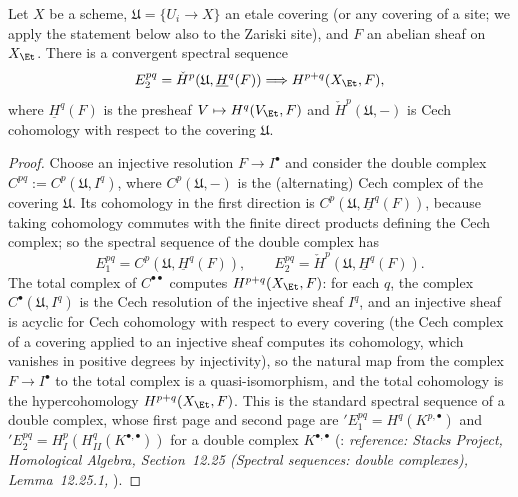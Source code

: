 \begin{lemma}
\label{lem:pcb-cech-spectral}
Let \(X\) be a scheme, \(\mathfrak U=\{U_i\to X\}\) an etale covering
(or any covering of a site; we apply the statement below also to the
Zariski site), and \(F\) an abelian sheaf on \(X_{\Et}\).  There is
a convergent spectral sequence
\[
 E_2^{pq}=\check H^p(\mathfrak U,\underline H^q(F))
 \Longrightarrow H^{p+q}(X_{\Et},F),
\]
where \(\underline H^q(F)\) is the presheaf
\(V\mapsto H^q(V_{\Et},F)\) and \(\check H^p(\mathfrak U,-)\) is
Cech cohomology with respect to the covering \(\mathfrak U\).
\end{lemma}
\begin{proof}
Choose an injective resolution \(F\to I^{\bullet}\) and consider the
double complex \(C^{pq}:=C^p(\mathfrak U,I^q)\), where
\(C^p(\mathfrak U,-)\) is the (alternating) Cech complex of the
covering \(\mathfrak U\).  Its cohomology in the first direction is
\(C^p(\mathfrak U,\underline H^q(F))\), because taking cohomology
commutes with the finite direct products defining the Cech complex;
so the spectral sequence of the double complex has
\[
 E_1^{pq}=C^p(\mathfrak U,\underline H^q(F)),\qquad
 E_2^{pq}=\check H^p(\mathfrak U,\underline H^q(F)).
\]
The total complex of \(C^{\bullet\bullet}\) computes
\(H^{p+q}(X_{\Et},F)\): for each \(q\), the complex
\(C^{\bullet}(\mathfrak U,I^q)\) is the Cech resolution of the
injective sheaf \(I^q\), and an injective sheaf is acyclic for Cech
cohomology with respect to every covering (the Cech complex of a
covering applied to an injective sheaf computes its cohomology,
which vanishes in positive degrees by injectivity), so the natural
map from the complex \(F\to I^{\bullet}\) to the total complex is a
quasi-isomorphism, and the total cohomology is the hypercohomology
\(H^{p+q}(X_{\Et},F)\).  This is the standard spectral sequence of
a double complex, whose first page and second page are
\({}'E_1^{pq}=H^q(K^{p,\bullet})\) and
\({}'E_2^{pq}=H^p_I(H^q_{II}(K^{\bullet,\bullet}))\) for a double
complex \(K^{\bullet,\bullet}\)
(: \emph{reference: Stacks
Project, Homological Algebra, Section~12.25 (Spectral sequences:
double complexes), Lemma~12.25.1, }).
\end{proof}

